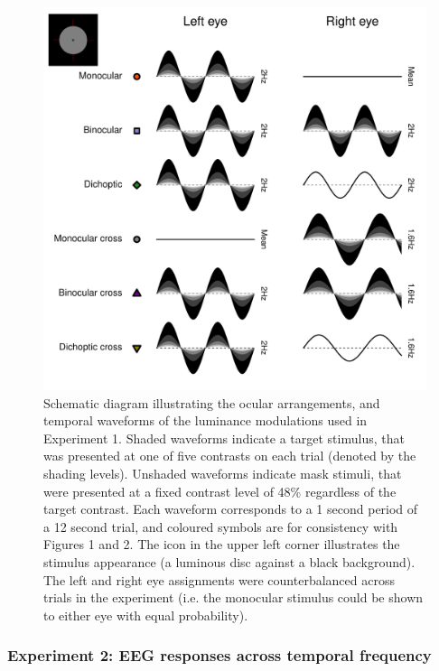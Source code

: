 \documentclass[
]{article}
\begin{document}
\begin{figure}

{\centering \includegraphics{Figures/methodsfig} 

}

\caption{Schematic diagram illustrating the ocular arrangements, and temporal waveforms of the luminance modulations used in Experiment 1. Shaded waveforms indicate a target stimulus, that was presented at one of five contrasts on each trial (denoted by the shading levels). Unshaded waveforms indicate mask stimuli, that were presented at a fixed contrast level of 48\% regardless of the target contrast. Each waveform corresponds to a 1 second period of a 12 second trial, and coloured symbols are for consistency with Figures 1 and 2. The icon in the upper left corner illustrates the stimulus appearance (a luminous disc against a black background). The left and right eye assignments were counterbalanced across trials in the experiment (i.e. the monocular stimulus could be shown to either eye with equal probability).}\label{fig:methodsfig}
\end{figure}

\hypertarget{experiment-2-eeg-responses-across-temporal-frequency}{%
\subsubsection{Experiment 2: EEG responses across temporal frequency}\label{experiment-2-eeg-responses-across-temporal-frequency}}
\end{document}
